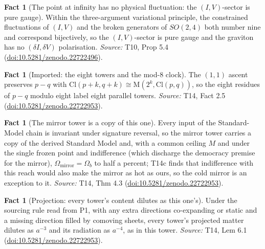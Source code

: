 \documentclass[11pt]{article}
\theoremstyle{definition}
\newtheorem{fact}[theorem]{Fact}
\theoremstyle{plain}
\newcommand{\changedmark}[2]{\marginpar{\raggedright\scriptsize\color{#1}#2}}
\providecommand{\Cl}{}\renewcommand{\Cl}{\mathrm{Cl}}
\providecommand{\Mat}{}\renewcommand{\Mat}{\mathrm{M}}
\begin{document}
\begin{fact}[The point at infinity has no physical fluctuation: the $(I,V)$-sector is pure gauge]\label{c:dark-energy.point-infinity-has-no-physical-fluctuation}
\changedmark{gray}{reworded}
Within the three-argument variational principle, the constrained fluctuations of $(I,V)$ and the broken generators of $SO(2,4)$ both number nine and correspond bijectively, so the $(I,V)$-sector is pure gauge and the graviton has no $(\delta I,\delta V)$ polarisation.
\emph{Source:} T10, Prop 5.4 (\href{https://doi.org/10.5281/zenodo.22722496}{doi:10.5281/zenodo.22722496}).
\end{fact}

\begin{fact}[Imported: the eight towers and the mod-8 clock]\label{c:dark-matter.imported-eight-towers-mod-8-clock}
The $(1,1)$ ascent preserves $p - q$ with $\Cl(p+k,q+k) \cong \Mat(2^{k}, \Cl(p,q))$, so the eight residues of $p - q$ modulo eight label eight parallel towers.
\emph{Source:} T14, Fact 2.5 (\href{https://doi.org/10.5281/zenodo.22722953}{doi:10.5281/zenodo.22722953}).
\end{fact}

\begin{fact}[The mirror tower is a copy of this one]\label{c:dark-matter.mirror-tower-copy-one}
Every input of the Standard-Model chain is invariant under signature reversal, so the mirror tower carries a copy of the derived Standard Model and, with a common ceiling $M$ and under the single frozen point and indifference (which discharge the democracy premise for the mirror), $\Omega_{\mathrm{mirror}} = \Omega_{b}$ to half a percent; T14c finds that indifference with this reach would also make the mirror as hot as ours, so the cold mirror is an exception to it.
\emph{Source:} T14, Thm 4.3 (\href{https://doi.org/10.5281/zenodo.22722953}{doi:10.5281/zenodo.22722953}).
\end{fact}

\begin{fact}[Projection: every tower's content dilutes as this one's]\label{c:dark-matter.projection-every-towers-content-dilutes-ones}
Under the sourcing rule read from P1, with any extra directions co-expanding or static and a missing direction filled by comoving sheets, every tower's projected matter dilutes as $a^{-3}$ and its radiation as $a^{-4}$, as in this tower.
\emph{Source:} T14, Lem 6.1 (\href{https://doi.org/10.5281/zenodo.22722953}{doi:10.5281/zenodo.22722953}).
\end{fact}
\end{document}
